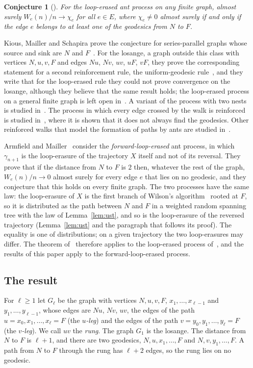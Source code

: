 \documentclass[11pt]{amsart}
\newtheorem{conjecture}[theorem]{Conjecture}
\theoremstyle{remark}
\begin{document}
\begin{conjecture}[{\cite[Conjecture~1.1(1)]{KMS}}]\label{conj}
For the loop-erased ant process on any finite graph, almost surely $W_e(n)/n\to\chi_e$ for all $e\in E$, where
$\chi_e\ne0$ almost surely if and only if the edge $e$ belongs to at least one of the geodesics from $N$ to $F$.
\end{conjecture}

Kious, Mailler and Schapira prove the conjecture for series-parallel graphs whose source and sink are $N$ and
$F$~\cite[Theorem~1.3]{KMS}. For the losange, a graph outside this class with vertices $N,u,v,F$ and edges
$Nu$, $Nv$, $uv$, $uF$, $vF$, they prove the corresponding statement for a second reinforcement rule, the
uniform-geodesic rule~\cite[Theorem~1.4]{KMS}, and they write that for the loop-erased rule they could not prove
convergence on the losange, although they believe that the same result holds; the loop-erased process on a general
finite graph is left open in~\cite{KMS}. A variant of the process with two nests is studied
in~\cite{MV}. The process in which every edge crossed by the walk is reinforced is studied in~\cite{KMS2}, where it is
shown that it does not always find the geodesics. Other reinforced walks that model the formation of paths by ants are
studied in~\cite{LGR,EFR,GSGC}.

Armfield and Mailler~\cite{AM} consider the \emph{forward-loop-erased} ant process, in which $\gamma_{n+1}$ is the
loop-erasure of the trajectory $X$ itself and not of its reversal. They prove that if the distance from $N$ to $F$ is
$2$ then, whatever the rest of the graph, $W_e(n)/n\to0$ almost surely for every edge $e$ that lies on no geodesic, and
they conjecture that this holds on every finite graph. The two processes have the same law: the loop-erasure of $X$ is
the first branch of Wilson's algorithm~\cite{Wilson} rooted at $F$, so it is distributed as the path between $N$ and
$F$ in a weighted random spanning tree with the law of Lemma~\ref{lem:ust}, and so is the loop-erasure of the
reversed trajectory (Lemma~\ref{lem:ust} and the paragraph that follows its proof). The equality is one of
distributions; on a given trajectory the two loop-erasures may differ. The theorem of~\cite{AM} therefore applies to the loop-erased process of~\cite{KMS}, and the
results of this paper apply to the forward-loop-erased process.

\subsection{The result}
For $\ell\ge1$ let $G_\ell$ be the graph with vertices $N,u,v,F$, $x_1,\dots,x_{\ell-1}$ and $y_1,\dots,y_{\ell-1}$,
whose edges are $Nu$, $Nv$, $uv$, the edges of the path $u=x_0,x_1,\dots,x_\ell=F$ (the \emph{$u$-leg}) and the edges
of the path $v=y_0,y_1,\dots,y_\ell=F$ (the \emph{$v$-leg}). We call $uv$ the \emph{rung}. The graph $G_1$ is the
losange. The distance from $N$ to $F$ is $\ell+1$, and there are two geodesics, $N,u,x_1,\dots,F$ and
$N,v,y_1,\dots,F$. A path from $N$ to $F$ through the rung has $\ell+2$ edges, so the rung lies on no geodesic.
\end{document}
